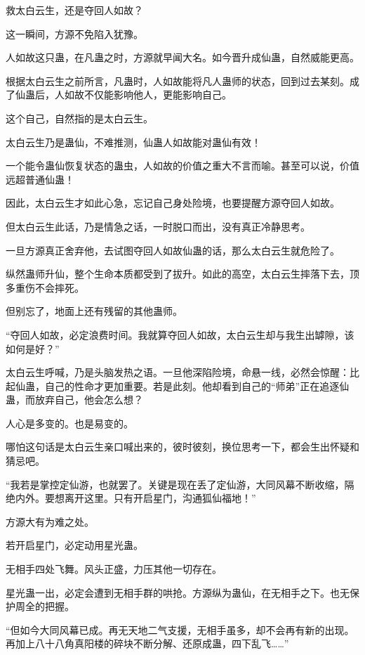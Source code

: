 
\begin{this_body}



救太白云生，还是夺回人如故？

这一瞬间，方源不免陷入犹豫。

人如故这只蛊，在凡蛊之时，方源就早闻大名。如今晋升成仙蛊，自然威能更高。

根据太白云生之前所言，凡蛊时，人如故能将凡人蛊师的状态，回到过去某刻。成了仙蛊后，人如故不仅能影响他人，更能影响自己。

这个自己，自然指的是太白云生。

太白云生乃是蛊仙，不难推测，仙蛊人如故能对蛊仙有效！

一个能令蛊仙恢复状态的蛊虫，人如故的价值之重大不言而喻。甚至可以说，价值远超普通仙蛊！

因此，太白云生才如此心急，忘记自己身处险境，也要提醒方源夺回人如故。

但太白云生此话，乃是情急之话，一时脱口而出，没有真正冷静思考。

一旦方源真正舍弃他，去试图夺回人如故仙蛊的话，那么太白云生就危险了。

纵然蛊师升仙，整个生命本质都受到了拔升。如此的高空，太白云生摔落下去，顶多重伤不会摔死。

但别忘了，地面上还有残留的其他蛊师。

“夺回人如故，必定浪费时间。我就算夺回人如故，太白云生却与我生出罅隙，该如何是好？”

太白云生呼喊，乃是头脑发热之语。一旦他深陷险境，命悬一线，必然会惊醒：比起仙蛊，自己的性命才更加重要。若是此刻。他却看到自己的“师弟”正在追逐仙蛊，而放弃自己，他会怎么想？

人心是多变的。也是易变的。

哪怕这句话是太白云生亲口喊出来的，彼时彼刻，换位思考一下，都会生出怀疑和猜忌吧。

“我若是掌控定仙游，也就罢了。关键是现在丢了定仙游，大同风幕不断收缩，隔绝内外。要想离开这里。只有开启星门，沟通狐仙福地！”

方源大有为难之处。

若开启星门，必定动用星光蛊。

无相手四处飞舞。风头正盛，力压其他一切存在。

星光蛊一出，必定会遭到无相手群的哄抢。方源纵为蛊仙，在无相手之下。也无保护周全的把握。

“但如今大同风幕已成。再无天地二气支援，无相手虽多，却不会再有新的出现。再加上八十八角真阳楼的碎块不断分解、还原成蛊，四下乱飞……”


\end{this_body}
